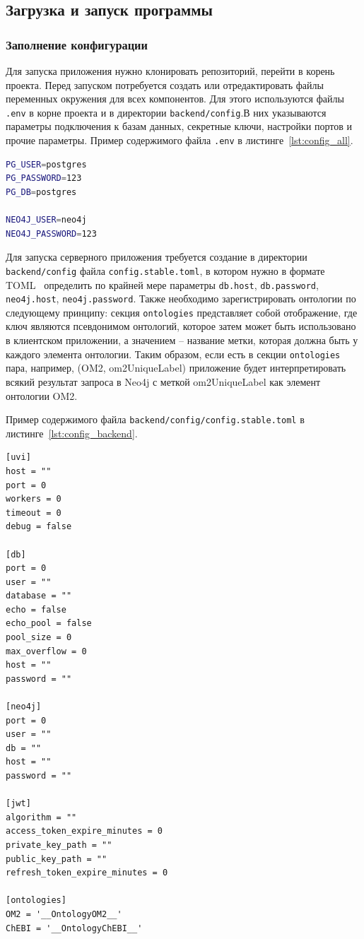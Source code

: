 \documentclass[a4paper,12pt,reqno]{article}
\begin{document}
\subsection{Загрузка и запуск программы}

\subsubsection{Заполнение конфигурации}

Для запуска приложения нужно клонировать репозиторий, перейти в корень проекта. Перед запуском потребуется создать или отредактировать файлы переменных окружения для всех компонентов. Для этого используются файлы \texttt{.env} в корне проекта и в директории \texttt{backend/config}.В них указываются параметры подключения к базам данных, секретные ключи, настройки портов и прочие параметры. Пример содержимого файла \texttt{.env} в листинге~\ref{lst:config_all}.
\begin{lstlisting}[frame=single, basicstyle=\footnotesize\ttfamily, label={lst:config_all}, caption={Заполнение конфигурационного файла всего приложения},captionpos=b, breaklines=true, breakatwhitespace=true, language=bash]
PG_USER=postgres
PG_PASSWORD=123
PG_DB=postgres

NEO4J_USER=neo4j
NEO4J_PASSWORD=123
\end{lstlisting}

Для запуска серверного приложения требуется создание в директории \texttt{backend/config} файла \texttt{config.stable.toml}, в котором нужно в формате TOML~\cite{Format:TOML} определить по крайней мере параметры \texttt{db.host}, \texttt{db.password}, \texttt{neo4j.host}, \texttt{neo4j.password}.
Также необходимо зарегистрировать онтологии по следующему принципу: секция \texttt{ontologies} представляет собой отображение, где ключ являются псевдонимом онтологий, которое затем может быть использовано в клиентском приложении, а значением – название метки, которая должна быть у каждого элемента онтологии.
Таким образом, если есть в секции \texttt{ontologies} пара, например, (OM2, om2UniqueLabel) приложение будет интерпретировать всякий результат запроса в Neo4j с меткой om2UniqueLabel как элемент онтологии OM2.

Пример содержимого файла \texttt{backend/config/config.stable.toml} в листинге~\ref{lst:config_backend}.
\begin{lstlisting}[frame=single, basicstyle=\footnotesize\ttfamily, label={lst:config_backend}, caption={Заполнение конфигурационного файла серверного приложения},captionpos=b, breaklines=true, breakatwhitespace=true]
[uvi]
host = ""
port = 0
workers = 0
timeout = 0
debug = false

[db]
port = 0
user = ""
database = ""
echo = false
echo_pool = false
pool_size = 0
max_overflow = 0
host = ""
password = ""

[neo4j]
port = 0
user = ""
db = ""
host = ""
password = ""

[jwt]
algorithm = ""
access_token_expire_minutes = 0
private_key_path = ""
public_key_path = ""
refresh_token_expire_minutes = 0

[ontologies]
OM2 = '__OntologyOM2__'
ChEBI = '__OntologyChEBI__'
\end{lstlisting}
\end{document}
